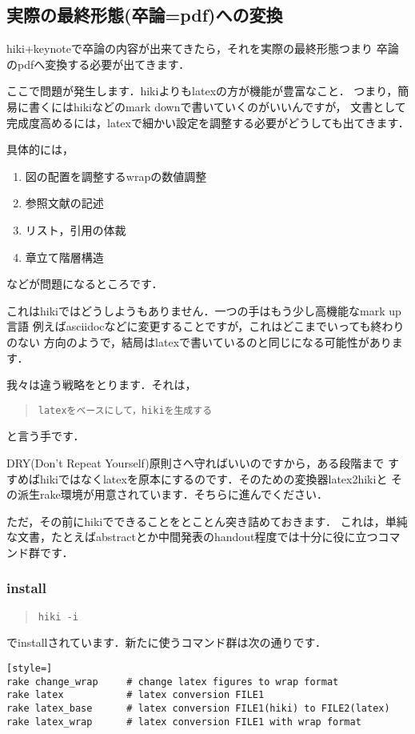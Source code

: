 \subsection{実際の最終形態(卒論=pdf)への変換}
hiki+keynoteで卒論の内容が出来てきたら，それを実際の最終形態つまり
卒論のpdfへ変換する必要が出てきます．

ここで問題が発生します．hikiよりもlatexの方が機能が豊富なこと．
つまり，簡易に書くにはhikiなどのmark downで書いていくのがいいんですが，
文書として完成度高めるには，latexで細かい設定を調整する必要がどうしても出てきます．

具体的には，
\begin{enumerate}
\item 図の配置を調整するwrapの数値調整
\item 参照文献の記述
\item リスト，引用の体裁
\item 章立て階層構造
\end{enumerate}
などが問題になるところです．

これはhikiではどうしようもありません．一つの手はもう少し高機能なmark up言語
例えばasciidocなどに変更することですが，これはどこまでいっても終わりのない
方向のようで，結局はlatexで書いているのと同じになる可能性があります．

我々は違う戦略をとります．それは，
\begin{quote}\begin{verbatim}
latexをベースにして，hikiを生成する
\end{verbatim}\end{quote}
と言う手です．

DRY(Don't Repeat Yourself)原則さへ守ればいいのですから，ある段階まで
すすめばhikiではなくlatexを原本にするのです．そのための変換器latex2hikiと
その派生rake環境が用意されています．そちらに進んでください．

ただ，その前にhikiでできることをとことん突き詰めておきます．
これは，単純な文書，たとえばabstractとか中間発表のhandout程度では十分に役に立つコマンド群です．

\subsubsection{install}\begin{quote}\begin{verbatim}
hiki -i
\end{verbatim}\end{quote}
でinstallされています．新たに使うコマンド群は次の通りです．
\begin{lstlisting}[style=]
rake change_wrap     # change latex figures to wrap format
rake latex           # latex conversion FILE1
rake latex_base      # latex conversion FILE1(hiki) to FILE2(latex)
rake latex_wrap      # latex conversion FILE1 with wrap format
\end{lstlisting}
